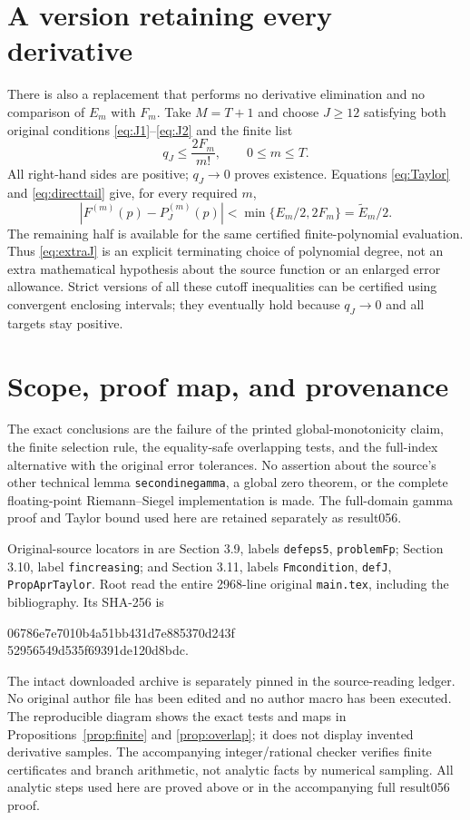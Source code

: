 \documentclass[11pt]{article}
\begin{document}
\section{A version retaining every derivative}\label{sec:all}
There is also a replacement that performs no derivative
elimination and no comparison of $E_m$ with $F_m$.
Take $M=T+1$ and choose $J\ge12$ satisfying both original
conditions \eqref{eq:J1}--\eqref{eq:J2} and the finite list
\begin{equation}\label{eq:extraJ}
q_J\le\frac{2F_m}{m!},\qquad 0\le m\le T.
\end{equation}
All right-hand sides are positive; $q_J\to0$ proves
existence. Equations \eqref{eq:Taylor} and
\eqref{eq:directtail} give, for every required $m$,
\begin{equation}\label{eq:halfall}
|F^{(m)}(p)-P_J^{(m)}(p)|
<\min\{E_m/2,2F_m\}=\widetilde E_m/2.
\end{equation}
The remaining half is available for the same certified
finite-polynomial evaluation. Thus \eqref{eq:extraJ}
is an explicit terminating choice of polynomial degree,
not an extra mathematical hypothesis about the source
function or an enlarged error allowance. Strict versions
of all these cutoff inequalities can be certified using
convergent enclosing intervals; they eventually hold
because $q_J\to0$ and all targets stay positive.

\section{Scope, proof map, and provenance}\label{sec:scope}
The exact conclusions are the failure of the printed
global-monotonicity claim, the finite selection rule,
the equality-safe overlapping tests, and the full-index
alternative with the original error tolerances. No assertion
about the source's other technical lemma
\texttt{secondinegamma}, a global zero theorem, or the
complete floating-point Riemann--Siegel implementation is
made. The full-domain gamma proof and Taylor bound used
here are retained separately as result056.

Original-source locators in \cite{AriasII} are
Section 3.9, labels \texttt{defeps5}, \texttt{problemFp};
Section 3.10, label \texttt{fincreasing}; and
Section 3.11, labels \texttt{Fmcondition}, \texttt{defJ},
\texttt{PropAprTaylor}. Root read the entire 2968-line
original \texttt{main.tex}, including the bibliography.
Its SHA-256 is
\begin{center}\small\ttfamily
06786e7e7010b4a51bb431d7e885370d243f\\
52956549d535f69391de120d8bdc.
\end{center}
The intact downloaded archive is separately pinned in the
source-reading ledger. No original author file has been
edited and no author macro has been executed.
The reproducible diagram shows the exact tests and maps
in Propositions~\ref{prop:finite} and \ref{prop:overlap};
it does not display invented derivative samples.
The accompanying integer/rational checker verifies finite
certificates and branch arithmetic, not analytic facts
by numerical sampling. All analytic steps used here are
proved above or in the accompanying full result056 proof.
\end{document}
